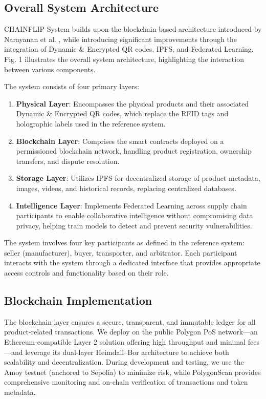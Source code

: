 \documentclass[conference]{IEEEtran}
\begin{document}
\subsection{Overall System Architecture}
CHAINFLIP System builds upon the blockchain-based architecture introduced by Narayanan et al. \cite{narayanan2024role}, while introducing significant improvements through the integration of Dynamic \& Encrypted QR codes, IPFS, and Federated Learning. Fig. 1 illustrates the overall system architecture, highlighting the interaction between various components.

The system consists of four primary layers:

\begin{enumerate}
\item \textbf{Physical Layer}: Encompasses the physical products and their associated Dynamic \& Encrypted QR codes, which replace the RFID tags and holographic labels used in the reference system.

\item \textbf{Blockchain Layer}: Comprises the smart contracts deployed on a permissioned blockchain network, handling product registration, ownership transfers, and dispute resolution.

\item \textbf{Storage Layer}: Utilizes IPFS for decentralized storage of product metadata, images, videos, and historical records, replacing centralized databases.

\item \textbf{Intelligence Layer}: Implements Federated Learning across supply chain participants to enable collaborative intelligence without compromising data privacy, helping train models to detect and prevent security vulnerabilities.
\end{enumerate}

The system involves four key participants as defined in the reference system: seller (manufacturer), buyer, transporter, and arbitrator. Each participant interacts with the system through a dedicated interface that provides appropriate access controls and functionality based on their role.

\subsection{Blockchain Implementation}

The blockchain layer ensures a secure, transparent, and immutable ledger for all product-related transactions. We deploy on the public Polygon PoS network—an Ethereum-compatible Layer 2 solution offering high throughput and minimal fees—and leverage its dual-layer Heimdall–Bor architecture to achieve both scalability and decentralization. During development and testing, we use the Amoy testnet (anchored to Sepolia) to minimize risk, while PolygonScan provides comprehensive monitoring and on-chain verification of transactions and token metadata.
\end{document}
